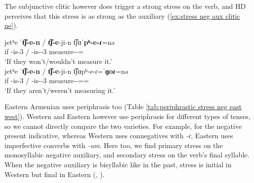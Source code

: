 The subjunctive clitic however does trigger a strong stress on the verb, and HD perceives that this stress is as strong as the auxiliary (\ref{ex:stress neg aux clitic ne}).  

\begin{exe}
	\ex \label{ex:stress neg aux clitic ne}
	\begin{xlist}
		\ex \gll jetʰe ˈ\textbf{t͡ʃ-e-n}  / \textbf{t͡ʃ-e}-ji-n  t͡ʃɑˈ\textbf{pʰ-e-ɾ}=nə
		\\
		if {\neggloss}-is-3{\pl}  / {\neggloss}-is-{\pst}-3{\pl}  measure-{\thgloss}-{\cn}={\sbjv}
		\\
		\trans `If they won't/wouldn't      measure it.'
		\\ 
		\ex \gll jetʰe ˈ\textbf{t͡ʃ-e-n}  / \textbf{t͡ʃ-e}-ji-n  t͡ʃɑpʰ-e-ɾ=ˈ\textbf{ɡoɾ}=nə
		\\
		if {\neggloss}-is-3{\pl}  / {\neggloss}-is-{\pst}-3{\pl}  measure-{\thgloss}-{\cn}={\prog}={\sbjv}
		\\
		\trans `If they aren't/weren't        measuring it.'
		\\ 
	\end{xlist}
\end{exe}

Eastern Armenian uses periphrasis too (Table \ref{tab:periphrastic stress neg east west}). Western and Eastern however use periphrasis for different types of tenses, so we cannot directly compare the two varieties. For  example, for the negative present indicative, whereas Western uses connegatives with \textit{-ɾ}, Eastern uses imperfective converbs with \textit{-um}. Here too, we find primary stress on the monosyllabic negative auxiliary, and secondary stress on the verb's final syllable. When the negative auxiliary is bisyllabic like in the past, stress is initial in Western but final in Eastern   (\citealt[338]{Adjarian-1971-LiakatarPhono}, \citealt[77]{Margaryan-1997-ArmenianPhonology}). 


